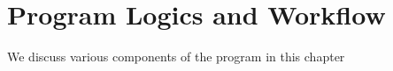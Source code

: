 
\chapter{Program Logics and Workflow} %

We discuss various components of the program in this chapter

\label{Chapter3} %

